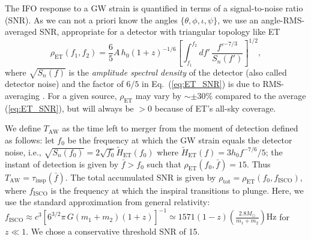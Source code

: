 \documentclass{aa}
\newcommand{\be}{\begin{equation}}
\newcommand{\ee}{\end{equation}}
\newcommand{\f}{\frac}
\begin{document}
The IFO response to a GW strain is quantified in terms of a signal-to-noise ratio (SNR).
As we can not a priori know the angles $\{\theta,\phi,\iota,\psi\}$, we use an angle-RMS-averaged SNR, 
appropriate for a detector with triangular topology like ET
%
\be
\rho_{\text{ET}}(f_1,f_2) = \f{6}{5}A\, h_0  (1+z)^{-1/6} \left[\int_{f_1}^{f_2} d f'\, \f{f'^{-7/3}}{S_n(f')}\right]^{1/2} \label{eq:ET_SNR},
\ee
%
where %
$\sqrt{S_n(f)}$ is the {\it amplitude spectral density} of the detector (also called detector noise) and
the factor of $6/5$ in Eq.~(\ref{eq:ET_SNR})
is due to RMS-averaging \citep{Akcay18}. %
For a given source, $\rho_\text{ET}$ may vary by $\sim \pm 30\%$ compared to the average (\ref{eq:ET_SNR}), but will always be $>0$ because of ET's all-sky coverage.

We define $T_\text{AW}$ as the time left to merger from the moment of detection 
defined as follows: let $f_0$ be the frequency
at which the GW strain equals the detector noise, i.e., $\sqrt{S_n(f_0)}=2\sqrt{f_0} \tilde{H}_\text{ET}(f_0)$ where $\tilde{H}_\text{ET}(f)=3 h_0 f^{-7/6}/5$;
the instant of detection is given by 
$\bar{f}>f_0$ such that $\rho_\text{ET}(f_0,\bar{f})=15$. 
Thus $T_\text{AW} = \tau_\text{insp}(\bar{f})$.
The total accumulated SNR is given by $\rho_\text{tot}=\rho_\text{ET}(f_0, f_\text{ISCO})$, 
where $f_\text{ISCO}$ is the frequency at which the inspiral transitions to plunge. 
Here, we use the standard approximation from general relativity: 
$f_\text{ISCO} \approx {c^3}\left[{6^{3/2}\pi\, G (m_1+m_2)(1+z)}\right]^{-1} \simeq {1571}(1-z) \left(\frac{2.8M_\odot}{m_1+m_2}\right)\text{Hz}$ for $z\ll 1$. 
We chose a conservative threshold SNR of 15. %
\end{document}
